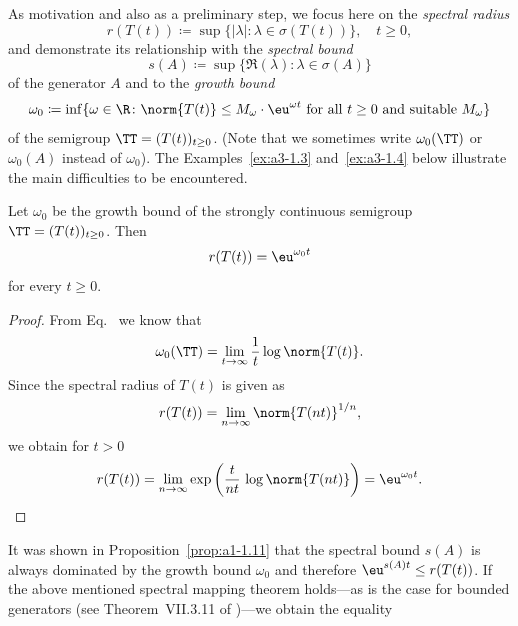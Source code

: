 As motivation and also as a preliminary step, we focus here on the \emph{spectral radius}
\begin{equation}\label{eq:a3-1.1}
	r(T(t)) \coloneq  \sup \{ |\lambda| \colon \lambda \in \sigma(T(t)) \}, \quad t \geq 0 ,
\end{equation}
and demonstrate its relationship with the \emph{spectral bound}
\begin{equation}\label{eq:a3-1.2}
	s(A) \coloneq  \sup \{ \Re(\lambda) \colon \lambda \in \sigma(A) \}
\end{equation}
of the generator $A$ and to the \emph{growth bound}
\begin{equation}\label{eq:a3-1.3}
	\omega_{0} \coloneq  \inf \{\omega \in \R  \colon \norm{T(t)} \leq M_{\omega}\cdot \eu^{\omega t} \text{ for all } t \geq 0 \text{ and suitable } M_{\omega}\}
\end{equation}
of the semigroup $\TT = (T(t))_{t\geq 0}$.
(Note that we sometimes write $\omega_{0}(\TT)$ or $\omega_{0}(A)$ instead of\/ $\omega_{0}$).
%
The Examples~\ref{ex:a3-1.3} and~\ref{ex:a3-1.4} below illustrate the main difficulties to be encountered.
\begin{proposition}\label{prop:a3-1.1}
Let $\omega_{0}$ be the growth bound of the strongly continuous semigroup $\TT = (T(t))_{t\geq 0}$.
Then
\begin{equation}\label{eq:a3-1.4}
	r(T(t)) = \eu^{\omega_{0} t}
\end{equation}
for every $t \geq 0$.
\end{proposition}
\begin{proof}
From Eq.~ we know that
\[
    \omega_{0}(\TT) = \lim_{t \to \infty} \frac{1}{t} \log \norm{T(t)} .
\]
Since the spectral radius of\/ $T(t)$ is given as
\[
    r(T(t)) = \lim_{n \to \infty} \norm{T(nt)}^{1/n} ,
\]
we obtain for $t > 0$
\[
    r(T(t)) = \lim_{n \to \infty} \exp\left( \frac{t}{nt}\,\log \norm{T(nt)}\right) = \eu^{\omega_{0} t} .
\]
\phantom{x}
\end{proof}
It was shown in Proposition~\ref{prop:a1-1.11} that the spectral bound $s(A)$ is always dominated by the growth bound $\omega_{0}$ and therefore $\eu^{s(A)t} \leq r(T(t))$.
If the above mentioned spectral mapping theorem holds---as is the case for bounded generators (\eg see Theorem~VII.3.11 of \textcite{dunfordschwartz:1958})---we obtain the equality
